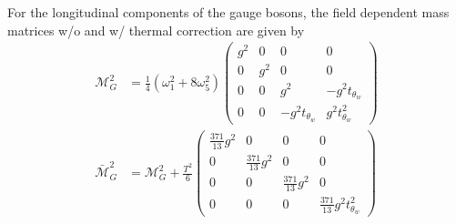 \documentclass[12pt]{article}
\begin{document}
For the longitudinal components of the gauge bosons, the field dependent mass matrices w/o and w/ thermal correction are given by
\begin{subequations}
    \begin{align}
        \mathcal{M}_G^2 &= \frac{1}{4}(\omega_1^2+8\omega_5^2)\begin{pmatrix}
            g^2 & 0 & 0 & 0 \\
            0 & g^2 & 0 & 0 \\
            0 & 0 & g^2 & -g^2t_{\theta_w} \\
            0 & 0 & -g^2t_{\theta_w} & g^2t_{\theta_w}^2
        \end{pmatrix}\\
        \bar{\mathcal{M}}_G^2 &= \mathcal{M}_G^2 + \frac{T^2}{6}\begin{pmatrix}
        \frac{371}{13}g^2 & 0 & 0 & 0 \\
        0 & \frac{371}{13}g^2 & 0 & 0 \\
        0 & 0 & \frac{371}{13}g^2 & 0 \\
        0 & 0 & 0 & \frac{371}{13}g^2 t_{\theta_w}^2
        \end{pmatrix}
    \end{align}
\end{subequations}





\end{document}

